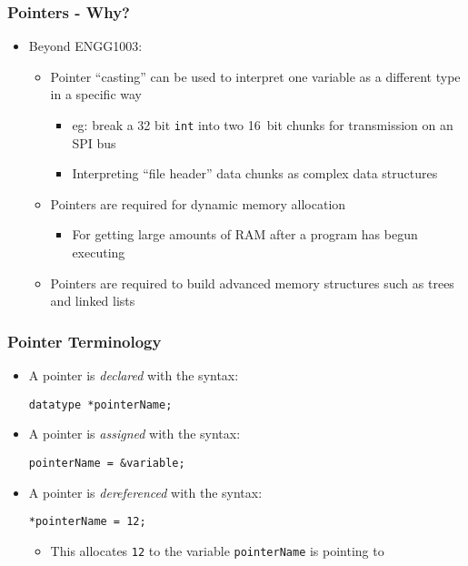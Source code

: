 \documentclass[14pt]{beamer}
\begin{document}
\begin{frame}
\frametitle{Pointers - Why?}
\begin{itemize}
\item Beyond ENGG1003:
	\begin{itemize}
		\item Pointer ``casting'' can be used to interpret one variable as a different type in a specific way
			\begin{itemize}
				\item eg: break a 32 bit \texttt{int} into two 16~bit chunks for transmission on an SPI bus
				\item Interpreting ``file header'' data chunks as complex data structures
			\end{itemize}
		\item Pointers are required for dynamic memory allocation
			\begin{itemize}
				\item For getting large amounts of RAM after a program has begun executing
			\end{itemize}
		\item Pointers are required to build advanced memory structures such as trees and linked lists
	\end{itemize}
\end{itemize}
\end{frame}

\begin{frame}[fragile]
\frametitle{Pointer Terminology}
\begin{itemize}
\item A pointer is \textit{declared} with the syntax:
\begin{lstlisting}[style=CStyle]
datatype *pointerName;
\end{lstlisting}
\item A pointer is \textit{assigned} with the syntax:
\begin{lstlisting}[style=CStyle]
pointerName = &variable;
\end{lstlisting}
\item A pointer is \textit{dereferenced} with the syntax:
\begin{lstlisting}[style=CStyle]
*pointerName = 12;
\end{lstlisting}
	\begin{itemize}
		\item This allocates \texttt{12} to the variable \texttt{pointerName} is pointing to
	\end{itemize}
\end{itemize}
\end{frame}
\end{document}
